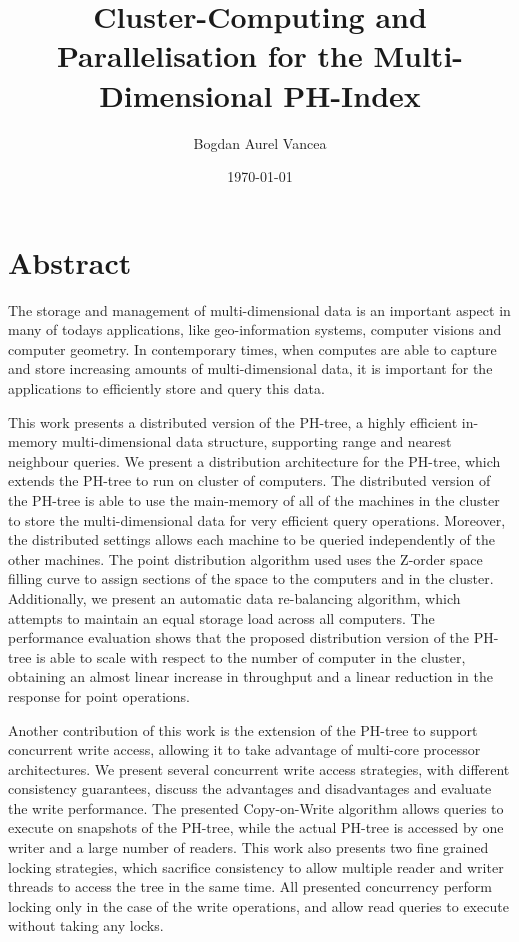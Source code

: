 \documentclass[11pt,a4paper]{globis-book}
\title{Cluster-Computing and Parallelisation for the
    Multi-Dimensional PH-Index}
\author{Bogdan Aurel Vancea}
\institute{Institute of Information Systems}
\date{\today}
\begin{document}
\frontmatter
\maketitlepage
\cleardoublepage
{}

\chapter*{Abstract}

The storage and management of multi-dimensional data is an important aspect in many of todays applications, like geo-information systems, computer visions and computer geometry. In contemporary times, when computes are able to capture and store increasing amounts of multi-dimensional data, it is important for the applications to efficiently store and query this data. 

This work presents a distributed version of the PH-tree, a highly efficient in-memory multi-dimensional data structure, supporting range and nearest neighbour queries. We present a distribution architecture for the PH-tree, which extends the PH-tree to run on cluster of computers. The distributed version of the PH-tree is able to use the main-memory of all of the machines in the cluster to store the multi-dimensional data for very efficient query operations. Moreover, the distributed settings allows each machine to be queried independently of the other machines. The point distribution algorithm used uses the Z-order space filling curve to assign sections of the space to the computers and in the cluster. Additionally, we present an automatic data re-balancing algorithm, which attempts to maintain an equal storage load across all computers. The performance evaluation shows that the proposed distribution version of the PH-tree is able to scale with respect to the number of computer in the cluster, obtaining an almost linear increase in throughput and a linear reduction in the response for point operations. 

Another contribution of this work is the extension of the PH-tree to support concurrent write access, allowing it to take advantage of multi-core processor architectures. We present several concurrent write access strategies, with different consistency guarantees, discuss the advantages and disadvantages and evaluate the write performance. The presented Copy-on-Write algorithm allows queries to execute on snapshots of the PH-tree, while the actual PH-tree is accessed by one writer and a large number of readers. This work also presents two fine grained locking strategies, which sacrifice consistency to allow multiple reader and writer threads to access the tree in the same time. All presented concurrency perform locking only in the case of the write operations, and allow read queries to execute without taking any locks.   
\end{document}

